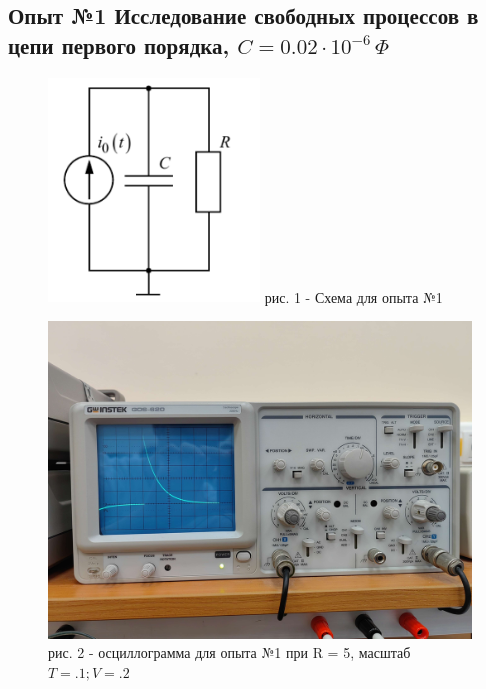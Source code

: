 \documentclass[a4paper,12pt]{report}
\begin{document}
\begin{flushleft}
    \item\subsection*{Опыт №1 Исследование свободных процессов в цепи первого порядка, $C = 0.02 \cdot 10^{-6} \, \Phi$}
    \item \begin{figure}[h!]
        \includegraphics[width=0.5\textwidth]{image.png}
        \label{ris:image1}
        рис. 1 - Схема для опыта №1 
    \end{figure}

     \begin{figure}[h!]
      \includegraphics[width=1\textwidth]{graph1.jpg}
      \label{ris:image2}
      рис. 2 - осциллограмма для опыта №1 при R = 5, масштаб $T = .1; V = .2$
  \end{figure}


\end{flushleft}
\end{document}
